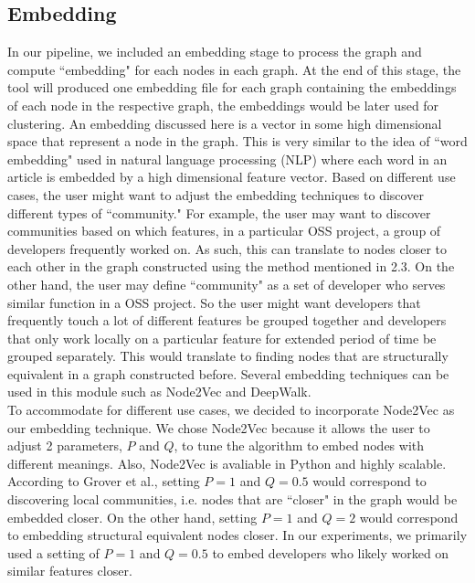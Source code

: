 \documentclass{article}
\begin{document}
\subsection{Embedding}
In our pipeline, we included an embedding stage to process the graph and compute ``embedding" for each nodes in each graph. At the end of this stage, the tool will produced one embedding file for each graph containing the embeddings of each node in the respective graph, the embeddings would be later used for clustering. An embedding discussed here is a vector in some high dimensional space that represent a node in the graph. This is very similar to the idea of ``word embedding" used in natural language processing (NLP) where each word in an article is embedded by a high dimensional feature vector. Based on different use cases, the user might want to adjust the embedding techniques to discover different types of ``community." For example, the user may want to discover communities based on which features, in a particular OSS project, a group of developers frequently worked on. As such, this can translate to nodes closer to each other in the graph constructed using the method mentioned in 2.3. On the other hand, the user may define ``community" as a set of developer who serves similar function in a OSS project. So the user might want developers that frequently touch a lot of different features be grouped together and developers that only work locally on a particular feature for extended period of time be grouped separately. This would translate to finding nodes that are structurally equivalent in a graph constructed before. Several embedding techniques can be used in this module such as Node2Vec\citep{grover2016node2vec} and DeepWalk\citep{perozzi2014deepwalk}.\\
To accommodate for different use cases, we decided to incorporate Node2Vec as our embedding technique. We chose Node2Vec because it allows the user to adjust 2 parameters, $P$ and $Q$, to tune the algorithm to embed nodes with different meanings. Also, Node2Vec is avaliable in Python and highly scalable. According to Grover et al.\citep{grover2016node2vec}, setting $P = 1$ and $Q = 0.5$ would correspond to discovering local communities, i.e. nodes that are ``closer" in the graph would be embedded closer. On the other hand, setting $P = 1$ and $Q = 2$ would correspond to embedding structural equivalent nodes closer\citep{grover2016node2vec}. In our experiments, we primarily used a setting of $P = 1$ and $Q = 0.5$ to embed developers who likely worked on similar features closer. 
\end{document}
